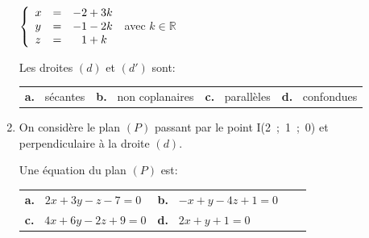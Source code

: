 \documentclass[10pt]{article}
\providecommand{\R}{\mathbb{R}}
\begin{document}
\begin{enumerate}
$\left\{\begin{array}{l c l}
x&=&- 2 + 3k\\y&=&- 1 - 2k\\
z&=&\phantom{-}1 + k
\end{array}\right.$ avec $k \in \R$

Les droites $(d)$ et $(d')$ sont:

\begin{center}
\begin{tabularx}{\linewidth}{*{4}{X}}
\textbf{a.~} sécantes &\textbf{b.~} non coplanaires&\textbf{c.~}  parallèles&\textbf{d.~} confondues
\end{tabularx}
\end{center}
\item On considère le plan $(P)$ passant par le point I(2~;~1~;~0) et perpendiculaire à la droite $(d)$.

Une équation du plan $(P)$ est:

\begin{center}
\begin{tabularx}{\linewidth}{*{4}{X}}
\textbf{a.~} $2x + 3y - z - 7=0$	&\textbf{b.~} $- x + y - 4z + 1 = 0$\\
\textbf{c.~} $4x + 6y - 2z + 9 = 0$	&\textbf{d.~} $2x + y + 1 = 0$
\end{tabularx}
\end{center}

\end{enumerate}

\bigskip
\end{document}
